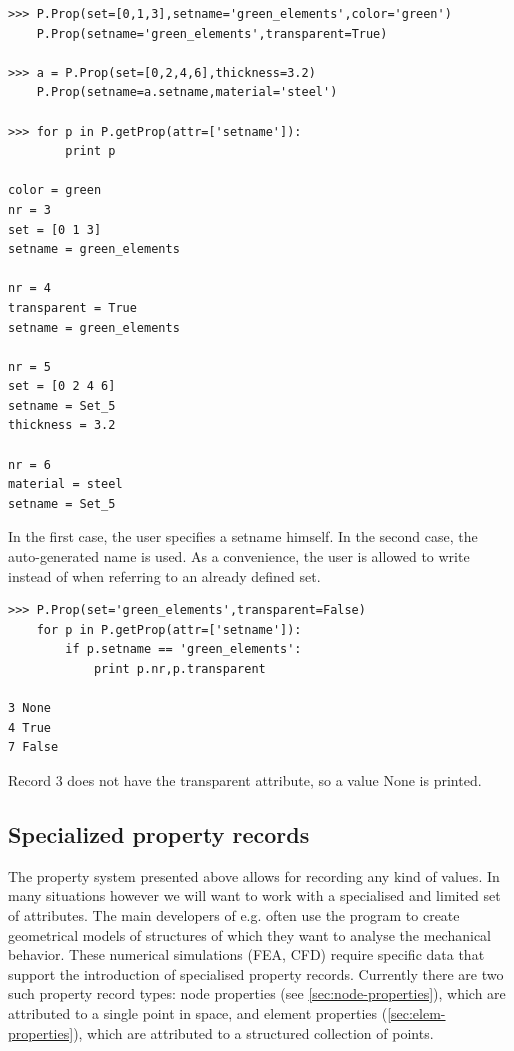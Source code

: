 \begin{verbatim}
>>> P.Prop(set=[0,1,3],setname='green_elements',color='green')
    P.Prop(setname='green_elements',transparent=True)

>>> a = P.Prop(set=[0,2,4,6],thickness=3.2)
    P.Prop(setname=a.setname,material='steel')

>>> for p in P.getProp(attr=['setname']):
        print p

color = green
nr = 3
set = [0 1 3]
setname = green_elements

nr = 4
transparent = True
setname = green_elements

nr = 5
set = [0 2 4 6]
setname = Set_5
thickness = 3.2

nr = 6
material = steel
setname = Set_5
\end{verbatim}
In the first case, the user specifies a setname himself. In the second case, the auto-generated name is used. As a convenience, the user is allowed to write  instead of  when referring to an already defined set. 
\begin{verbatim}
>>> P.Prop(set='green_elements',transparent=False)
    for p in P.getProp(attr=['setname']):
        if p.setname == 'green_elements':
            print p.nr,p.transparent

3 None
4 True
7 False
\end{verbatim}
Record 3 does not have the transparent attribute, so a value None is printed.


\subsection{Specialized property records}
\label{sec:special-properties}

The property system presented above allows for recording any kind of values. In many situations however we will want to work with a specialised and limited set of attributes. The main developers of \pyf e.g. often use the program to create geometrical models of structures of which they want to analyse the mechanical behavior. These numerical simulations (FEA, CFD) require specific data that support the introduction of specialised property records. Currently there are two such property record types: node properties (see \ref{sec:node-properties}), which are attributed to a single point in space, and element properties (\ref{sec:elem-properties}), which are attributed to a structured collection of points.


